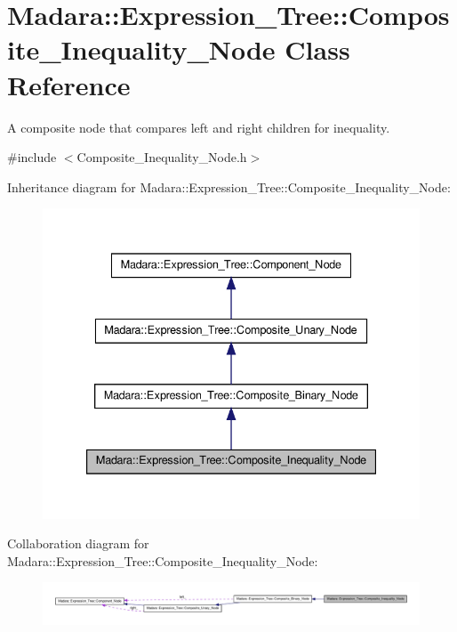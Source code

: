 \hypertarget{classMadara_1_1Expression__Tree_1_1Composite__Inequality__Node}{
\section{Madara::Expression\_\-Tree::Composite\_\-Inequality\_\-Node Class Reference}
\label{d3/d6b/classMadara_1_1Expression__Tree_1_1Composite__Inequality__Node}
}


A composite node that compares left and right children for inequality.  




{\ttfamily \#include $<$Composite\_\-Inequality\_\-Node.h$>$}



Inheritance diagram for Madara::Expression\_\-Tree::Composite\_\-Inequality\_\-Node:
\nopagebreak
\begin{figure}[H]
\begin{center}
\leavevmode
\includegraphics[width=336pt]{de/dd9/classMadara_1_1Expression__Tree_1_1Composite__Inequality__Node__inherit__graph}
\end{center}
\end{figure}


Collaboration diagram for Madara::Expression\_\-Tree::Composite\_\-Inequality\_\-Node:
\nopagebreak
\begin{figure}[H]
\begin{center}
\leavevmode
\includegraphics[width=400pt]{d8/d30/classMadara_1_1Expression__Tree_1_1Composite__Inequality__Node__coll__graph}
\end{center}
\end{figure}
